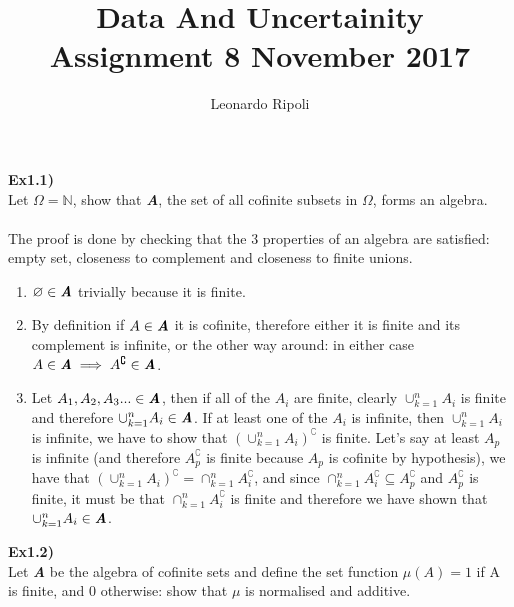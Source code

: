 \documentclass[12pt,mythesisstyle]{report}
\title{Data And Uncertainity\\Assignment 8 November 2017}
\author{Leonardo Ripoli}
\date{}
\begin{document}
\begin{titlepage}
\maketitle
\end{titlepage}
\textbf{Ex1.1)}\\
Let \(\Omega=\mathbb{N}\), show that \textbf{\textit{A}}, the set of all cofinite subsets in \(\Omega\), forms an algebra.
\\
\\The proof is done by checking that the 3 properties of an algebra are satisfied: empty set, closeness to complement and closeness to finite unions.
\\
\begin{enumerate}
\item \(\varnothing\in\textbf{\textit{A}}\) trivially because it is finite.\\
\item By definition if \(A\in\textbf{\textit{A}}\) it is cofinite, therefore either it is finite and its complement is infinite, or the other way around: in either case \(A\in\textbf{\textit{A}}\implies A^\complement\in\textbf{\textit{A}}\).\\
\item Let \(A_1, A_2, A_3...\in\textbf{\textit{A}}\), then if all of the \(A_i\) are finite, clearly \(\cup_{k=1}^nA_i\) is finite and therefore \(\cup_{k=1}^nA_i\in\textbf{\textit{A}}\). If at least one of the \(A_i\) is infinite, then \(\cup_{k=1}^nA_i\) is infinite, we have to show that \((\cup_{k=1}^nA_i)^\complement\) is finite. Let's say at least \(A_p\) is infinite (and therefore \(A_p^\complement\) is finite because \(A_p\) is cofinite by hypothesis), we have that \((\cup_{k=1}^nA_i)^\complement=\cap_{k=1}^nA_i^\complement\), and since \(\cap_{k=1}^nA_i^\complement\subseteq A_p^\complement\) and \(A_p^\complement\) is finite, it must be that \(\cap_{k=1}^nA_i^\complement\) is finite and therefore we have shown that \(\cup_{k=1}^nA_i\in\textbf{\textit{A}}\).
\end{enumerate}
\textbf{Ex1.2)}\\
Let \textbf{\textit{A}} be the algebra of cofinite sets and define the set function \(\mu(A)=1\) if A is finite, and 0 otherwise: show that \(\mu\) is normalised and additive.
\end{document}
